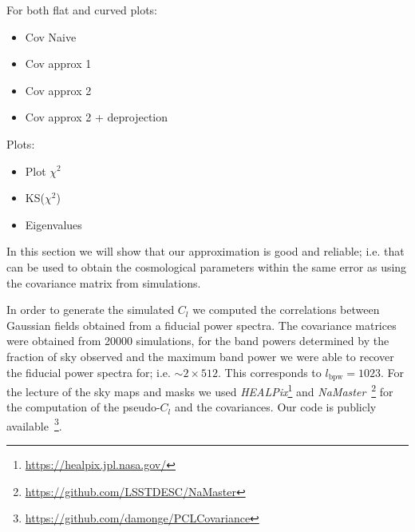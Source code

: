 \documentclass[useAMS,usenatbib]{mn2e}
\newcommand{\clth}{C_l^{th}}
\newcommand{\clf}{C_l^{fore}}
\newcommand{\cl}{C_l}
\begin{document}
For both flat and curved plots:
\begin{itemize}
\item Cov Naive
\item Cov approx 1
\item Cov approx 2
\item Cov approx 2 + deprojection
\end{itemize}

Plots:
\begin{itemize}
\item Plot $\chi^2$
\item KS($\chi^2$)
\item Eigenvalues
\end{itemize}

In this section we will show that our approximation is good and reliable; i.e.
that can be used to obtain the cosmological parameters within the same error
as using the covariance matrix from simulations. 

In order to generate the simulated $\cl$ we computed the correlations between
Gaussian fields obtained from a fiducial power spectra. The covariance
matrices were obtained from 20000 simulations, for the band powers determined
by the fraction of sky observed and the maximum band power we were able to
recover the fiducial power spectra for; i.e. $\sim 2 \times 512$. This
corresponds to $l_{\mbox{bpw}} = 1023$. For the lecture of the sky maps and
masks we used \textit{HEALPix}\footnote{\url{https://healpix.jpl.nasa.gov/}}
and
\textit{NaMaster}~\cite{2018arXiv180909603A}\footnote{\url{https://github.com/LSSTDESC/NaMaster}}
for the computation of the pseudo-$\cl$ and the covariances. Our code is
publicly available~\footnote{\url{https://github.com/damonge/PCLCovariance}}.



\end{document}
